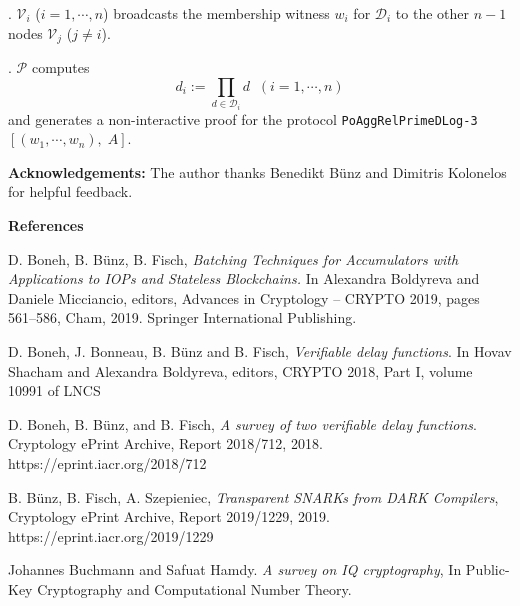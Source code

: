 \documentclass[11pt, lettersize, notitlepage, leqno, footskip=0.6cm]{article}
\newcommand{\pl}{\prod\limits}
\newcommand{\mc}{\mathcal}
\newcommand{\mP}{\mc{P}}
\newcommand{\V}{\mc{V}}
\newcommand{\vs}{\vspace{-0.15cm}}
\newcommand{\noin}{\noindent}
\numberwithin{equation}{section}
\begin{document}
\noin 1. $\V_i$ ($i=1,\cdots,n$) broadcasts the membership witness $w_i$ for $\mc{D}_i$ to the other $n-1$ nodes $\V_j$ ($j\neq i$). 

\noin 2. $\mP$ computes \vs $$d_i:= \pl_{d\in\mc{D}_i} d\;\;(i=1,\cdots,n)$$ and generates a non-interactive proof for the protocol \verb|PoAggRelPrimeDLog-3|$[(w_1,\cdots,w_n),\; A]$.




\bigskip


\bigskip

\bigskip

\noin \textbf{Acknowledgements:} The author thanks Benedikt B\"{u}nz and Dimitris Kolonelos for helpful feedback.

\bigskip



\begin{center}\textbf{References} \end{center}
\footnotesize

\noindent [BBF19] D. Boneh, B. B\"{u}nz, B. Fisch, \textit{Batching Techniques for Accumulators with Applications to IOPs and Stateless Blockchains.} In Alexandra Boldyreva and Daniele Micciancio, editors, Advances in Cryptology – CRYPTO 2019, pages 561–586, Cham, 2019. Springer International Publishing. \vspace{0.1cm}

\noin [BBBF18] D. Boneh, J. Bonneau, B. B\"{u}nz and B. Fisch, \textit{Verifiable delay functions}. In Hovav Shacham and Alexandra Boldyreva, editors, CRYPTO 2018, Part I, volume 10991 of LNCS \vspace{0.1cm}

\noin [BBF18] D. Boneh, B. B\"{u}nz, and B. Fisch, \textit{A survey of two verifiable delay functions}. Cryptology ePrint Archive, Report 2018/712, 2018. https://eprint.iacr.org/2018/712 \vspace{0.1cm}

\noindent [BFS19] B. B\"{u}nz, B. Fisch, A. Szepieniec, \textit{Transparent SNARKs from DARK Compilers}, Cryptology ePrint Archive, Report 2019/1229, 2019. https://eprint.iacr.org/2019/1229 \vspace{0.1cm}

\noin [BH01] Johannes Buchmann and Safuat Hamdy. \textit{A survey on IQ cryptography}, In Public-Key Cryptography and Computational Number Theory. \vspace{0.1cm}
\end{document}
